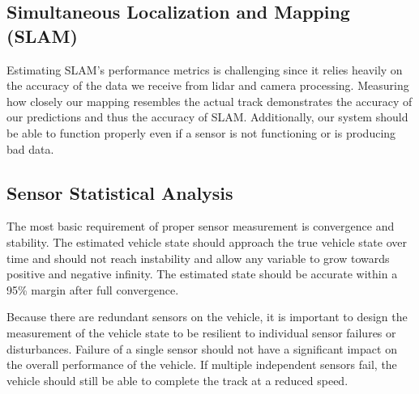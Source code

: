 \documentclass[10pt, onecolumn, draftclsnofoot, letterpaper,compsoc]{IEEEtran}
\begin{document}
\subsection{Simultaneous Localization and Mapping (SLAM)}

Estimating SLAM's performance metrics is challenging since it relies heavily on the accuracy of the data we receive from lidar and camera processing. Measuring how closely our mapping resembles the actual track demonstrates the accuracy of our predictions and thus the accuracy of SLAM. Additionally, our system should be able to function properly even if a sensor is not functioning or is producing bad data. 

\subsection{Sensor Statistical Analysis}

The most basic requirement of proper sensor measurement is convergence and stability. The estimated vehicle state should approach the true vehicle state over time and should not reach instability and allow any variable to grow towards positive and negative infinity. The estimated state should be accurate within a 95\% margin after full convergence.

Because there are redundant sensors on the vehicle, it is important to design the measurement of the vehicle state to be resilient to individual sensor failures or disturbances. Failure of a single sensor should not have a significant impact on the overall performance of the vehicle. If multiple independent sensors fail, the vehicle should still be able to complete the track at a reduced speed.
\end{document}
